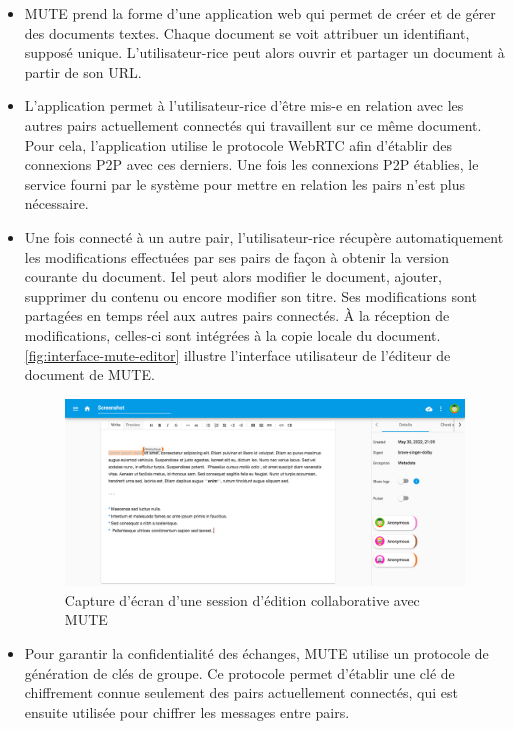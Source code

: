 \begin{itemize}
    \item \ac{MUTE} prend la forme d'une application web qui permet de créer et de gérer des documents textes.
        Chaque document se voit attribuer un identifiant, supposé unique.
        L'utilisateur-rice peut alors ouvrir et partager un document à partir de son URL.
    \item L'application permet à l'utilisateur-rice d'être mis-e en relation avec les autres pairs actuellement connectés qui travaillent sur ce même document.
        Pour cela, l'application utilise le protocole WebRTC afin d'établir des connexions \ac{P2P} avec ces derniers.
        Une fois les connexions \ac{P2P} établies, le service fourni par le système pour mettre en relation les pairs n'est plus nécessaire.
    \item Une fois connecté à un autre pair, l'utilisateur-rice récupère automatiquement les modifications effectuées par ses pairs de façon à obtenir la version courante du document.
        Iel peut alors modifier le document, \ie ajouter, supprimer du contenu ou encore modifier son titre.
        Ses modifications sont partagées en temps réel aux autres pairs connectés.
        À la réception de modifications, celles-ci sont intégrées à la copie locale du document.
        \autoref{fig:interface-mute-editor} illustre l'interface utilisateur de l'éditeur de document de MUTE.
        \begin{figure}[!ht]
            \centering
            \includegraphics[width=\linewidth]{img/screenshot-mute-editor.png}
            \caption{Capture d'écran d'une session d'édition collaborative avec MUTE}
            \label{fig:interface-mute-editor}
        \end{figure}
    \item Pour garantir la confidentialité des échanges, \ac{MUTE} utilise un protocole de génération de clés de groupe.
        Ce protocole permet d'établir une clé de chiffrement connue seulement des pairs actuellement connectés, qui est ensuite utilisée pour chiffrer les messages entre pairs.

\end{itemize}
